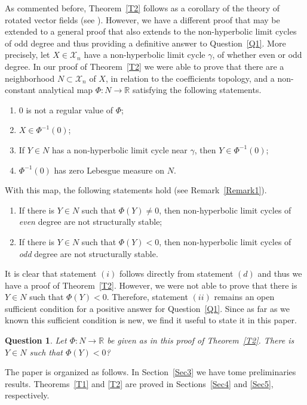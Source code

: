 \documentclass[11pt]{amsart}
\newtheorem{question}{Question}
\begin{document}
As commented before, Theorem~\ref{T2} follows as a corollary of the theory of rotated vector fields (see \cite[Section $4.6$]{Perko2001}). However, we have a different proof that may be extended to a general proof that also extends to the non-hyperbolic limit cycles of odd degree and thus providing a definitive answer to Question~\ref{Q1}. More precisely, let $X\in\mathcal{X}_n$ have a non-hyperbolic limit cycle $\gamma$, of whether even or odd degree. In our proof of Theorem~\ref{T2} we were able to prove that there are a neighborhood $N\subset\mathcal{X}_n$ of $X$, in relation to the coefficients topology, and a non-constant analytical map $\Phi\colon N\to\mathbb{R}$ satisfying the following statements.
\begin{enumerate}[label=(\alph*)]
	\item $0$ is not a regular value of $\Phi$;
	\item $X\in \Phi^{-1}(0)$;
	\item If $Y\in N$ has a non-hyperbolic limit cycle near $\gamma$, then $Y\in \Phi^{-1}(0)$;
	\item $\Phi^{-1}(0)$ has zero Lebesgue measure on $N$.
\end{enumerate}
With this map, the following statements hold (see Remark~\ref{Remark1}).
\begin{enumerate}[label=(\roman*)]
	\item If there is $Y\in N$ such that $\Phi(Y)\neq0$, then non-hyperbolic limit cycles of \emph{even} degree are not structurally stable;
	\item If there is $Y\in N$ such that $\Phi(Y)<0$, then non-hyperbolic limit cycles of \emph{odd} degree are not structurally stable.
\end{enumerate}
It is clear that statement $(i)$ follows directly from statement $(d)$ and thus we have a proof of Theorem~\ref{T2}. However, we were not able to prove that there is $Y\in N$ such that $\Phi(Y)<0$. Therefore, statement $(ii)$ remains an open sufficient condition for a positive answer for Question~\ref{Q1}. Since as far as we known this sufficient condition is new, we find it useful to state it in this paper.

\begin{question}\label{Q2}
	Let $\Phi\colon N\to\mathbb{R}$ be given as in this proof of Theorem~\ref{T2}. There is $Y\in N$ such that $\Phi(Y)<0$?
\end{question}

The paper is organized as follows. In Section~\ref{Sec3} we have tome preliminaries results. Theorems~\ref{T1} and \ref{T2} are proved in Sections~\ref{Sec4} and \ref{Sec5}, respectively. 
\end{document}
